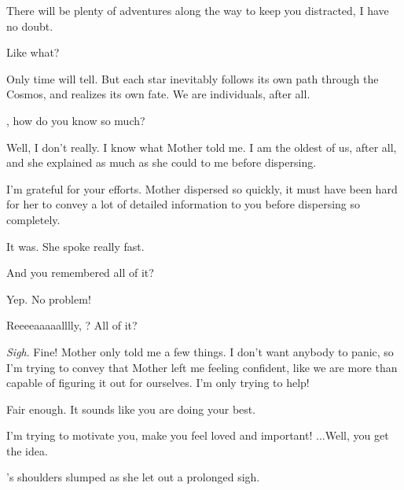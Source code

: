 \documentclass[main.tex]{subfiles}
\begin{document}
\par \Maia There will be plenty of adventures along the way to keep you distracted, I have no doubt.

\par \Sterope  Like what?  

\par \Maia Only time will tell.  But each star inevitably follows its own path through the Cosmos, and realizes its own fate.  We are individuals, after all.

\par \Sterope \rmmaia, how do you know so much?

\par \Maia Well, I don't really. I know what Mother told me.  I am the oldest of us, after all, and she explained as much as she could to me before dispersing.  

\par \Sterope I'm grateful for your efforts.  Mother dispersed so quickly, it must have been hard for her to convey a lot of detailed information to you before dispersing so completely.

\par \Maia It was.  She spoke really fast.

\par \Sterope And you remembered all of it?

\par \Maia Yep.  No problem!  

\par \Sterope Reeeeaaaaalllly, \rmmaia?  All of it?

\par \Maia \textit{Sigh}.  Fine!  Mother only told me a few things.  I don't want anybody to panic, so I'm trying to convey that Mother left me feeling confident, like we are more than capable of figuring it out for ourselves.  I'm only trying to help!  

\par \Sterope Fair enough.  It sounds like you are doing your best.

\par \Maia I'm trying to motivate you, make you feel loved and important!  ...Well, you get the idea. 

\par \nar \rmmaia's shoulders slumped as she let out a prolonged sigh.
\end{document}
